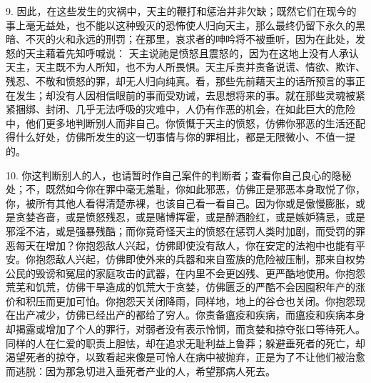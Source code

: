 9. 因此，在这些发生的灾祸中，天主的鞭打和惩治并非欠缺；既然它们在现今的事上毫无益处，也不能以这种毁灭的恐怖使人归向天主，那么最终仍留下永久的黑暗、不灭的火和永远的刑罚；在那里，哀求者的呻吟将不被垂听，因为在此处，发怒的天主藉着先知呼喊说： 天主说祂是愤怒且震怒的，因为在这地上没有人承认天主，天主既不为人所知，也不为人所畏惧。天主斥责并责备说谎、情欲、欺诈、残忍、不敬和愤怒的罪，却无人归向纯真。看，那些先前藉天主的话所预言的事正在发生；却没有人因相信眼前的事而受劝诫，去思想将来的事。就在那些灵魂被紧紧捆绑、封闭、几乎无法呼吸的灾难中，人仍有作恶的机会，在如此巨大的危险中，他们更多地判断别人而非自己。你愤慨于天主的愤怒，仿佛你邪恶的生活还配得什么好处，仿佛所发生的这一切事情与你的罪相比，都是无限微小、不值一提的。\par

10. 你这判断别人的人，也请暂时作自己案件的判断者；查看你自己良心的隐秘处；不，既然如今你在罪中毫无羞耻，你如此邪恶，仿佛正是邪恶本身取悦了你，你，被所有其他人看得清楚赤裸，也该自己看一看自己。因为你或是傲慢膨胀，或是贪婪吝啬，或是愤怒残忍，或是赌博挥霍，或是醉酒脸红，或是嫉妒猜忌，或是邪淫不洁，或是强暴残酷；而你竟奇怪天主的愤怒在惩罚人类时加剧，而受罚的罪恶每天在增加？你抱怨敌人兴起，仿佛即使没有敌人，你在安定的法袍中也能有平安。你抱怨敌人兴起，仿佛即使外来的兵器和来自蛮族的危险被压制，那来自权势公民的毁谤和冤屈的家庭攻击的武器，在内里不会更凶残、更严酷地使用。你抱怨荒芜和饥荒，仿佛干旱造成的饥荒大于贪婪，仿佛匮乏的严酷不会因囤积年产的涨价和积压而更加可怕。你抱怨天关闭降雨，同样地，地上的谷仓也关闭。你抱怨现在出产减少，仿佛已经出产的都给了穷人。你责备瘟疫和疾病，而瘟疫和疾病本身却揭露或增加了个人的罪行，对弱者没有表示怜悯，而贪婪和掠夺张口等待死人。同样的人在仁爱的职责上胆怯，却在追求无耻利益上鲁莽；躲避垂死者的死亡，却渴望死者的掠夺，以致看起来像是可怜人在病中被抛弃，正是为了不让他们被治愈而逃脱：因为那急切进入垂死者产业的人，希望那病人死去。\par

